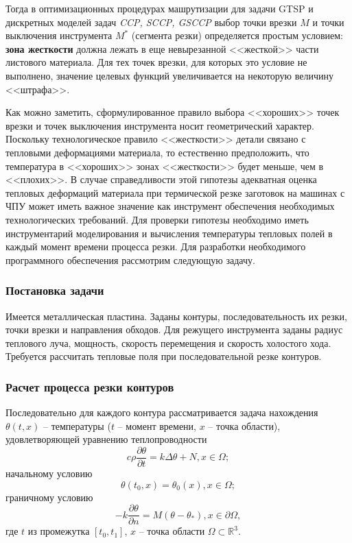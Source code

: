 Тогда в оптимизационных процедурах машрутизации
для задачи GTSP  и дискретных моделей задач {\it CCP, SCCP, GSCCP}
выбор точки врезки $M$
и точки выключения инструмента $M^*$
(сегмента резки) определяется простым условием:
{\bf зона жесткости} должна лежать в еще невырезанной
<<жесткой>> части листового материала.
Для тех точек врезки, для которых это условие не выполнено,
значение целевых функций  увеличивается на некоторую величину
<<штрафа>>.

Как можно заметить,
сформулированное правило выбора <<хороших>> точек врезки
и точек выключения инструмента носит геометрический характер.
Поскольку технологическое правило <<жесткости>> детали
связано с тепловыми деформациями материала,
то естественно предположить,
что температура в <<хороших>> зонах <<жесткости>> будет меньше,
чем в <<плохих>>.
В случае справедливости этой гипотезы
адекватная оценка тепловых деформаций материала
при термической резке заготовок на машинах с ЧПУ
может иметь важное значение как инструмент
обеспечения необходимых технологических требований.
Для проверки гипотезы необходимо иметь инструментарий
моделирования и вычисления температуры тепловых полей в
каждый момент времени процесса резки.
Для разработки необходимого программного
обеспечения рассмотрим следующую задачу.

\subsubsection*{Постановка задачи}

Имеется металлическая пластина.
Заданы контуры, последовательность их резки,
точки врезки и направления обходов.
Для режущего инструмента заданы радиус теплового луча,
мощность, скорость перемещения и скорость холостого хода.
Требуется рассчитать тепловые поля при
последовательной резке контуров.

\subsubsection*{Расчет процесса резки контуров}

Последовательно для каждого контура рассматривается задача нахождения
$\theta(t, x)$ -- температуры
($t$ -- момент времени,
$x$ -- точка области),
удовлетворяющей уравнению теплопроводности
\begin{equation}
  c \rho \frac{\partial \theta}{\partial t}=k \Delta \theta +N, x \in \Omega
  ;
\end{equation}
начальному условию
\begin{equation}
  \theta(t_0, x)=\theta_0(x), x \in \Omega
  ;
\end{equation}
граничному условию
\begin{equation}
  -k \frac{\partial \theta}{\partial n}=M(\theta - \theta_*), x \in \partial \Omega
  ,
\end{equation}
где $t$ из промежутка $[t_0, t_1]$,
$x$ -- точка области
$\Omega \subset \mathbb R^3$.

